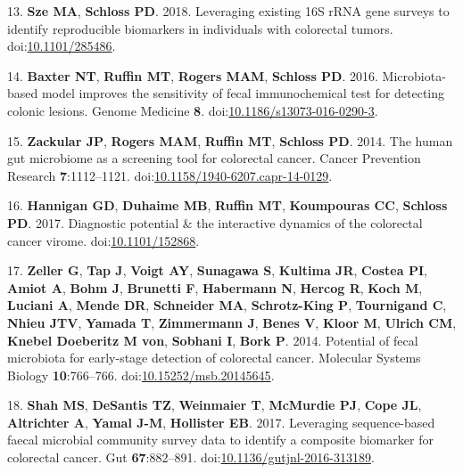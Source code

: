 \documentclass[11pt,]{article}
\begin{document}
\leavevmode\hypertarget{ref-Sze2018}{}%
13. \textbf{Sze MA}, \textbf{Schloss PD}. 2018. Leveraging existing 16S
rRNA gene surveys to identify reproducible biomarkers in individuals
with colorectal tumors.
doi:\href{https://doi.org/10.1101/285486}{10.1101/285486}.

\leavevmode\hypertarget{ref-Baxter2016}{}%
14. \textbf{Baxter NT}, \textbf{Ruffin MT}, \textbf{Rogers MAM},
\textbf{Schloss PD}. 2016. Microbiota-based model improves the
sensitivity of fecal immunochemical test for detecting colonic lesions.
Genome Medicine \textbf{8}.
doi:\href{https://doi.org/10.1186/s13073-016-0290-3}{10.1186/s13073-016-0290-3}.

\leavevmode\hypertarget{ref-Zackular2014}{}%
15. \textbf{Zackular JP}, \textbf{Rogers MAM}, \textbf{Ruffin MT},
\textbf{Schloss PD}. 2014. The human gut microbiome as a screening tool
for colorectal cancer. Cancer Prevention Research \textbf{7}:1112--1121.
doi:\href{https://doi.org/10.1158/1940-6207.capr-14-0129}{10.1158/1940-6207.capr-14-0129}.

\leavevmode\hypertarget{ref-Hannigan2017}{}%
16. \textbf{Hannigan GD}, \textbf{Duhaime MB}, \textbf{Ruffin MT},
\textbf{Koumpouras CC}, \textbf{Schloss PD}. 2017. Diagnostic potential
\& the interactive dynamics of the colorectal cancer virome.
doi:\href{https://doi.org/10.1101/152868}{10.1101/152868}.

\leavevmode\hypertarget{ref-Zeller2014}{}%
17. \textbf{Zeller G}, \textbf{Tap J}, \textbf{Voigt AY},
\textbf{Sunagawa S}, \textbf{Kultima JR}, \textbf{Costea PI},
\textbf{Amiot A}, \textbf{Bohm J}, \textbf{Brunetti F},
\textbf{Habermann N}, \textbf{Hercog R}, \textbf{Koch M},
\textbf{Luciani A}, \textbf{Mende DR}, \textbf{Schneider MA},
\textbf{Schrotz-King P}, \textbf{Tournigand C}, \textbf{Nhieu JTV},
\textbf{Yamada T}, \textbf{Zimmermann J}, \textbf{Benes V},
\textbf{Kloor M}, \textbf{Ulrich CM}, \textbf{Knebel Doeberitz M von},
\textbf{Sobhani I}, \textbf{Bork P}. 2014. Potential of fecal microbiota
for early-stage detection of colorectal cancer. Molecular Systems
Biology \textbf{10}:766--766.
doi:\href{https://doi.org/10.15252/msb.20145645}{10.15252/msb.20145645}.

\leavevmode\hypertarget{ref-Shah2017}{}%
18. \textbf{Shah MS}, \textbf{DeSantis TZ}, \textbf{Weinmaier T},
\textbf{McMurdie PJ}, \textbf{Cope JL}, \textbf{Altrichter A},
\textbf{Yamal J-M}, \textbf{Hollister EB}. 2017. Leveraging
sequence-based faecal microbial community survey data to identify a
composite biomarker for colorectal cancer. Gut \textbf{67}:882--891.
doi:\href{https://doi.org/10.1136/gutjnl-2016-313189}{10.1136/gutjnl-2016-313189}.
\end{document}

